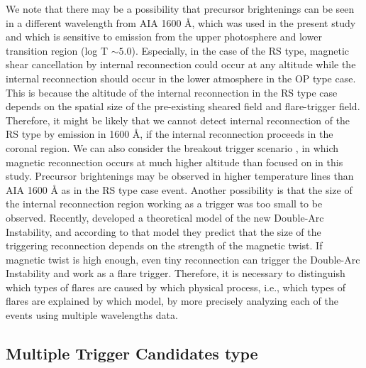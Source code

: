 \documentclass[10pt,preprint2]{aastex}
\begin{document}
We note that there may be a possibility that precursor brightenings can be seen in a different wavelength from AIA 1600 {\AA}, which was used in the present study and which is sensitive to emission from the upper photosphere and lower transition region (log T $\sim 5.0$).
Especially, in the case of the RS type, magnetic shear cancellation by internal reconnection could occur at any altitude while the internal reconnection should occur in the lower atmosphere in the OP type case.
This is because the altitude of the internal reconnection in the RS type case depends on the spatial size of the pre-existing sheared field and flare-trigger field.
Therefore, it might be likely that we cannot detect internal reconnection of the RS type by emission in 1600 {\AA}, if the internal reconnection proceeds in the coronal region.
We can also consider the breakout trigger scenario \citep{Antiochos99}, in which magnetic reconnection occurs at much higher altitude than focused on in this study.
Precursor brightenings may be observed in higher temperature lines than AIA 1600 {\AA} as in the RS type case event.
Another possibility is that the size of the internal reconnection region working as a trigger was too small to be observed.
Recently, \citet{ishiguro17} developed a theoretical model of the new Double-Arc Instability, and according to that model they predict that the size of the triggering reconnection depends on the strength of the magnetic twist.
If magnetic twist is high enough, even tiny reconnection can trigger the Double-Arc Instability and work as a flare trigger.
Therefore, it is necessary to distinguish which types of flares are caused by which physical process, i.e., which types of flares are explained by which model, by more precisely analyzing each of the events using multiple wavelengths data.

\subsection{Multiple Trigger Candidates type} \label{sec:dis_MTR}
\end{document}
